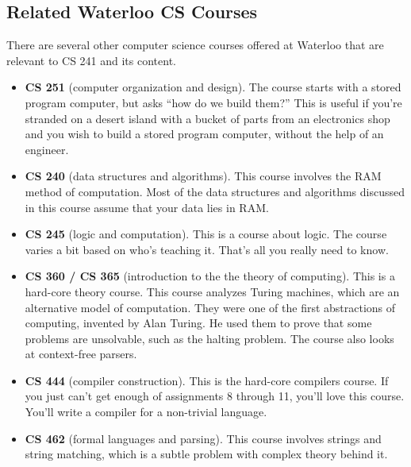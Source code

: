 \documentclass[]{article}
\theoremstyle{definition}
\begin{document}
		\subsection{Related Waterloo CS Courses}
			There are several other computer science courses offered at Waterloo that are relevant to CS 241 and its content.
			\begin{itemize}
				\item \textbf{CS 251} (computer organization and design). The course starts with a stored program computer, but asks ``how do we build them?'' This is useful if you're stranded on a desert island with a bucket of parts from an electronics shop and you wish to build a stored program computer, without the help of an engineer.
				\item \textbf{CS 240} (data structures and algorithms). This course involves the RAM method of computation. Most of the data structures and algorithms discussed in this course assume that your data lies in RAM.
				\item \textbf{CS 245} (logic and computation). This is a course about logic. The course varies a bit based on who's teaching it. That's all you really need to know.
				\item \textbf{CS 360 / CS 365} (introduction to the the theory of computing). This is a hard-core theory course. This course analyzes Turing machines, which are an alternative model of computation. They were one of the first abstractions of computing, invented by Alan Turing. He used them to prove that some problems are unsolvable, such as the halting problem. The course also looks at context-free parsers.
				\item \textbf{CS 444} (compiler construction). This is the hard-core compilers course. If you just can't get enough of assignments 8 through 11, you'll love this course. You'll write a compiler for a non-trivial language.
				\item \textbf{CS 462} (formal languages and parsing). This course involves strings and string matching, which is a subtle problem with complex theory behind it.
			\end{itemize}
\end{document}
